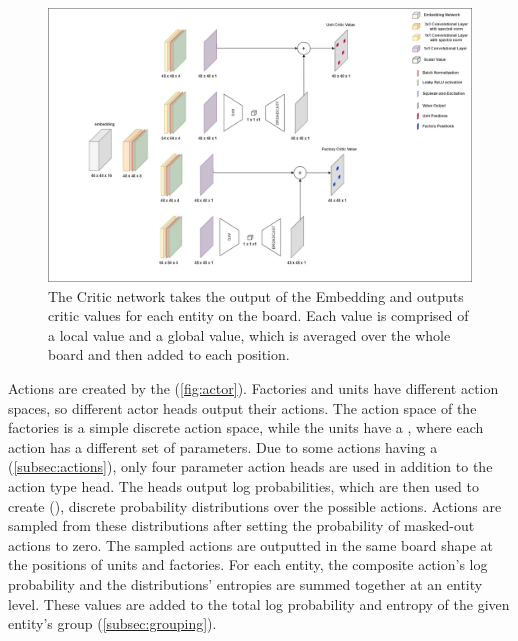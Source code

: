 \bigskip

\begin{figure}[htbp]
    \centering
    \includegraphics[width=1\linewidth]{images/methods_hybrid/actor_critic/critic.png}
    \captionsetup{justification=justified, singlelinecheck=false, width=1\linewidth, labelfont=bf} 
    \caption[]{The Critic network takes the output of the Embedding and outputs critic values for each entity on the board. Each value is comprised of a local value and a global value, which is averaged over the whole board and then added to each position.}
    \label{fig:critic}
\end{figure}

\noindent Actions are created by the  (\autoref{fig:actor}). Factories and units have different action spaces, so different actor heads output their actions. The action space of the factories is a simple discrete action space, while the units have a , where each action has a different set of parameters. Due to some actions having a  (\autoref{subsec:actions}), only four parameter action heads are used in addition to the action type head. The heads output log probabilities, which are then used to create  (\cite{categorical}), discrete probability distributions over the possible actions. Actions are sampled from these distributions after setting the probability of masked-out actions to zero. The sampled actions are outputted in the same board shape at the positions of units and factories. For each entity, the composite action's log probability and the distributions' entropies are summed together at an entity level. These values are added to the total log probability and entropy of the given entity's group (\autoref{subsec:grouping}).

